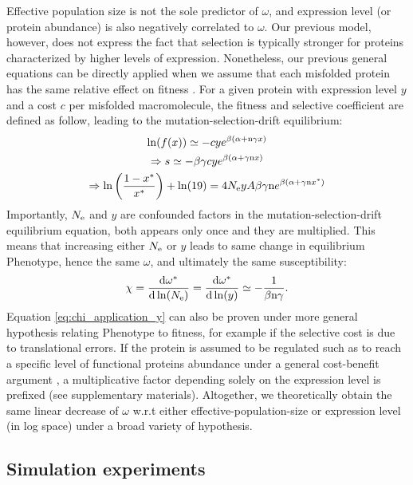 Effective population size is not the sole predictor of $\omega$, and expression level (or protein abundance) is also negatively correlated to $\omega$. 
Our previous model, however, does not express the fact that selection is typically stronger for proteins characterized by higher levels of expression.
Nonetheless, our previous general equations can be directly applied when we assume that each misfolded protein has the same relative effect on fitness \citep{Drummond2005a, Wilke2006, Drummond2008, Serohijos2012}. 
For a given protein with expression level $y$ and a cost $c$ per misfolded macromolecule, the fitness and selective coefficient are defined as follow, leading to the mutation-selection-drift equilibrium:
\begin{gather}
\ln (f(x)) \simeq - c y e^{\beta (\alpha + \text{n} \gamma x)} \\
\Rightarrow s \simeq - \beta \gamma c y e^{\beta(\alpha + \gamma \text{n} x)} \\
\Rightarrow \ln \left( \frac{1 - x^{*}}{x^{*}} \right) + \ln (19) = 4N_{\mathrm{e}} y A \beta \gamma \text{n} e^{\beta(\alpha + \gamma \text{n} x^{*})}
\end{gather}
Importantly, $N_{\mathrm{e}}$ and $y$ are confounded factors in the mutation-selection-drift equilibrium equation, both appears only once and they are multiplied.
This means that increasing either $N_{\mathrm{e}}$ or $y$ leads to same change in equilibrium \gls{Phenotype}, hence the same $\omega$, and ultimately the same susceptibility:
\begin{align}
\chi = \frac{ \der \omega\eq}{\der \ln (\Ne)} = \frac{ \der \omega\eq}{\der \ln (y)} \simeq - \frac{1}{\beta \Nsite \gamma}. \label{eq:chi_application_y}
\end{align}
Equation \ref{eq:chi_application_y} can also be proven under more general hypothesis relating \gls{Phenotype} to fitness, for example if the selective cost is due to translational errors.
If the protein is assumed to be regulated such as to reach a specific level of functional proteins abundance under a general cost-benefit argument \citep{Cherry2010,Gout2010}, a multiplicative factor depending solely on the expression level is prefixed (see supplementary materials).
Altogether, we theoretically obtain the same linear decrease of $\omega$ w.r.t either \gls{effective-population-size} or expression level (in log space) under a broad variety of hypothesis.

\subsection{Simulation experiments}

